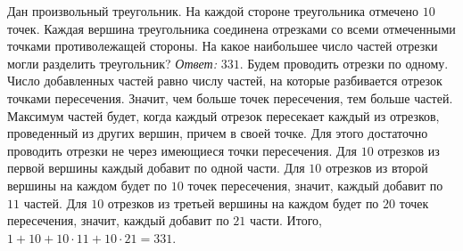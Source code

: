 \problem
Дан произвольный треугольник.
На каждой стороне треугольника отмечено $10$ точек.
Каждая вершина треугольника соединена отрезками со всеми отмеченными точками
противолежащей стороны.
На какое наибольшее число частей отрезки могли разделить треугольник?
\solution
\emph{Ответ:} $331$.
Будем проводить отрезки по одному.
Число добавленных частей равно числу частей, на которые разбивается отрезок
точками пересечения.
Значит, чем больше точек пересечения, тем больше частей.
Максимум частей будет, когда каждый отрезок пересекает каждый из отрезков,
проведенный из других вершин, причем в своей точке.
Для этого достаточно проводить отрезки не через имеющиеся точки пересечения.
Для $10$ отрезков из первой вершины каждый добавит по одной части.
Для $10$ отрезков из второй вершины на каждом будет по $10$ точек пересечения,
значит, каждый добавит по $11$ частей.
Для $10$ отрезков из третьей вершины на каждом будет по $20$ точек пересечения,
значит, каждый добавит по $21$ части.
Итого, $1 + 10 + 10 \cdot 11 + 10 \cdot 21 = 331$.
\endproblem
